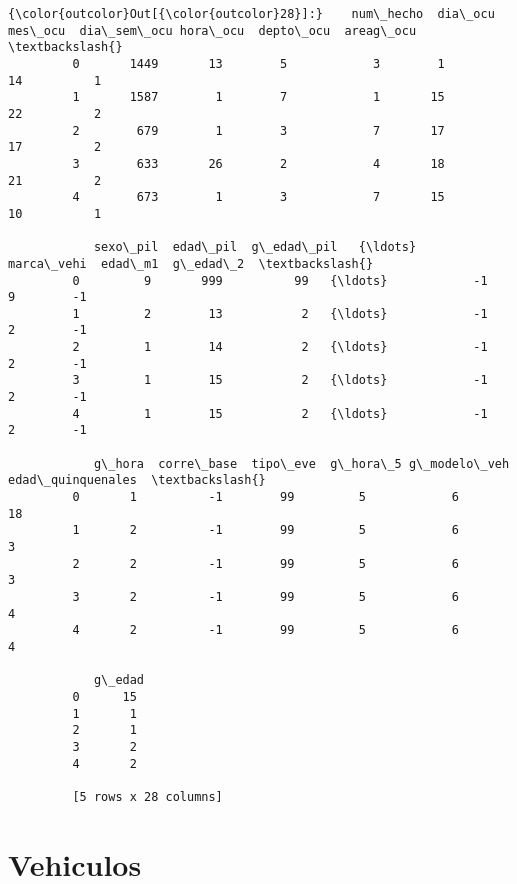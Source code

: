 \documentclass[11pt]{article}
\begin{document}
\begin{Verbatim}[commandchars=\\\{\}]
{\color{outcolor}Out[{\color{outcolor}28}]:}    num\_hecho  dia\_ocu  mes\_ocu  dia\_sem\_ocu hora\_ocu  depto\_ocu  areag\_ocu  \textbackslash{}
         0       1449       13        5            3        1         14          1   
         1       1587        1        7            1       15         22          2   
         2        679        1        3            7       17         17          2   
         3        633       26        2            4       18         21          2   
         4        673        1        3            7       15         10          1   
         
            sexo\_pil  edad\_pil  g\_edad\_pil   {\ldots}    marca\_vehi  edad\_m1  g\_edad\_2  \textbackslash{}
         0         9       999          99   {\ldots}            -1        9        -1   
         1         2        13           2   {\ldots}            -1        2        -1   
         2         1        14           2   {\ldots}            -1        2        -1   
         3         1        15           2   {\ldots}            -1        2        -1   
         4         1        15           2   {\ldots}            -1        2        -1   
         
            g\_hora  corre\_base  tipo\_eve  g\_hora\_5 g\_modelo\_veh  edad\_quinquenales  \textbackslash{}
         0       1          -1        99         5            6                 18   
         1       2          -1        99         5            6                  3   
         2       2          -1        99         5            6                  3   
         3       2          -1        99         5            6                  4   
         4       2          -1        99         5            6                  4   
         
            g\_edad  
         0      15  
         1       1  
         2       1  
         3       2  
         4       2  
         
         [5 rows x 28 columns]
\end{Verbatim}
            
    \hypertarget{vehiculos}{%
\section{Vehiculos}\label{vehiculos}}
\end{document}
